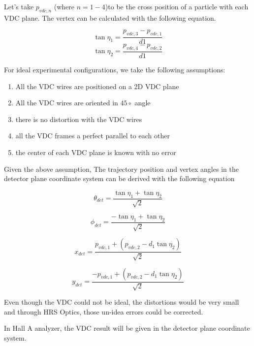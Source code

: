 Let's take $p_{vdc,n}$ (where ${n=1-4}$)to be the cross position of a particle with each VDC plane. The vertex can be calculated with the following equation. 

\begin{equation}
    \tan \eta_{1} = \frac{p_{vdc,3} - p_{vdc, 1}}{d1}    
\end{equation}
\begin{equation}
    \tan \eta_{2} = \frac{p_{vdc,4} - p_{vdc, 2}}{d1}    
\end{equation}

For ideal experimental configurations, we take the following assumptions:
\begin{enumerate}
    \item All the VDC wires are positioned on a 2D VDC plane
    \item All the VDC wires are oriented in $45\circ$ angle
    \item there is no distortion with the VDC wires
    \item all the VDC frames a perfect parallel to each other 
    \item the center of each VDC plane is known with no error
\end{enumerate}

Given the above assumption, The trajectory position and vertex angles in the detector plane coordinate system can be derived with the following equation 

\begin{equation}
    \theta_{det} = \frac{\tan{\eta_1} + \tan{\eta_2}}{\sqrt{2}}
\end{equation}
    
\begin{equation}
    \phi_{det} =  \frac{-\tan{\eta_1} + \tan{\eta_2}}{\sqrt{2}}
\end{equation}

\begin{equation}
    x_{det} = \frac{p_{vdc,1} + (p_{vdc,2} - d_1\tan{\eta_2})}{\sqrt{2}}
\end{equation}

\begin{equation}
    y_{det} = \frac{-p_{vdc,1} + (p_{vdc,2} - d_1\tan{\eta_2})}{\sqrt{2}}
\end{equation}

Even though the VDC could not be ideal, the distortions would be very small and through HRS Optics, those un-idea errors could be corrected. 

In Hall A analyzer, the VDC result will be given in the detector plane coordinate system.

